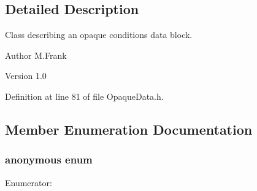 \subsection{Detailed Description}
Class describing an opaque conditions data block. \begin{DoxyAuthor}{Author}
M.Frank 
\end{DoxyAuthor}
\begin{DoxyVersion}{Version}
1.0 
\end{DoxyVersion}


Definition at line 81 of file OpaqueData.h.

\subsection{Member Enumeration Documentation}
\hypertarget{class_d_d4hep_1_1_opaque_data_block_a6c653f7754960906a4a260f035e915bc}{
\subsubsection[{"@4}]{\setlength{\rightskip}{0pt plus 5cm}anonymous enum}}
\label{class_d_d4hep_1_1_opaque_data_block_a6c653f7754960906a4a260f035e915bc}
\begin{Desc}
\item[Enumerator: ]\par
\begin{description}
\item[{\em 
\hypertarget{class_d_d4hep_1_1_opaque_data_block_a6c653f7754960906a4a260f035e915bca9c3e9fc003a5148f3f1707780b347eeb}{
PLAIN\_\-DATA}
\label{class_d_d4hep_1_1_opaque_data_block_a6c653f7754960906a4a260f035e915bca9c3e9fc003a5148f3f1707780b347eeb}
}]\item[{\em 
\hypertarget{class_d_d4hep_1_1_opaque_data_block_a6c653f7754960906a4a260f035e915bca10ec45b910bc75641243cb866d304fa7}{
ALLOC\_\-DATA}
\label{class_d_d4hep_1_1_opaque_data_block_a6c653f7754960906a4a260f035e915bca10ec45b910bc75641243cb866d304fa7}
}]\item[{\em 
\hypertarget{class_d_d4hep_1_1_opaque_data_block_a6c653f7754960906a4a260f035e915bcafca2143abe27ac43e936bf63f6771b9e}{
BOUND\_\-DATA}
\label{class_d_d4hep_1_1_opaque_data_block_a6c653f7754960906a4a260f035e915bcafca2143abe27ac43e936bf63f6771b9e}
}]\end{description}
\end{Desc}




